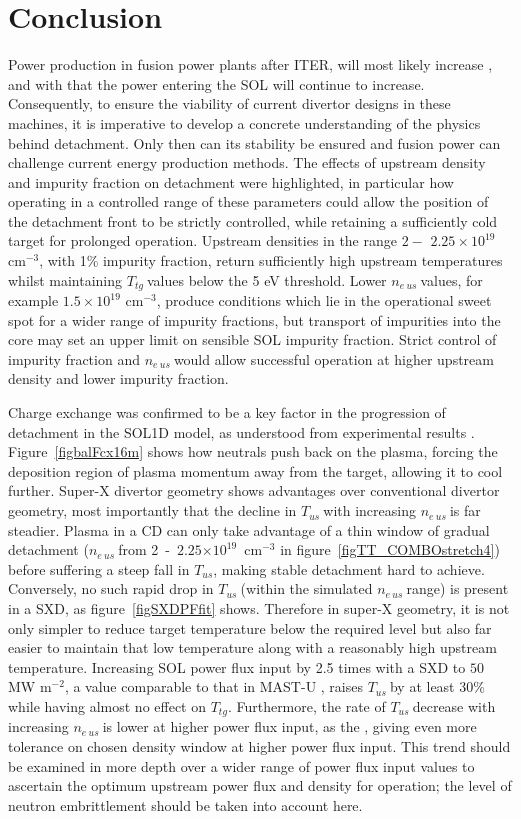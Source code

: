 \documentclass[12pt]{article}  %
\providecommand{\e}[1]{\ensuremath{\times 10^{#1}}} %
\providecommand{\noNe}[1]{{${#1}\times 10^{19}$ cm$^{-3}$}} %
\providecommand{\pow}[1]{{$^{#1}$}} %
\providecommand{\neus}{$n_{e~us}~$} %
\providecommand{\Tus}{$T_{us}~$} %
\providecommand{\Ttg}{$T_{tg}~$} %
\begin{document}
\section{Conclusion}\label{secConclusion}
Power production in fusion power plants after ITER, will most likely increase \cite{Federici2014}, and with that the power entering the SOL will continue to increase. Consequently, to ensure the viability of current divertor designs in these machines, it is imperative to develop a concrete understanding of the physics behind detachment. Only then can its stability be ensured and fusion power can challenge current energy production methods. The effects of upstream density and impurity fraction on detachment were highlighted, in particular how operating in a controlled range of these parameters could allow the position of the detachment front to be strictly controlled, while retaining a sufficiently cold target for prolonged operation. Upstream densities in the range $2 -$ \noNe{2.25}, with 1\% impurity fraction, return sufficiently high upstream temperatures whilst maintaining \Ttg values below the 5 eV threshold. Lower \neus values, for example \noNe{1.5}, produce conditions which lie in the operational sweet spot for a wider range of impurity fractions, but transport of impurities into the core may set an upper limit on sensible SOL impurity fraction. Strict control of impurity fraction and \neus would allow successful operation at higher upstream density and lower impurity fraction. 

Charge exchange was confirmed to be a key factor in the progression of detachment in the SOL1D model, as understood from experimental results \cite{Loarte1998, Wischmeier2009}. Figure~\ref{figbalFcx16m} shows how neutrals push back on the plasma, forcing the deposition region of plasma momentum away from the target, allowing it to cool further. Super-X divertor geometry shows advantages over conventional divertor geometry, most importantly that the decline in \Tus with increasing \neus is far steadier. Plasma in a CD can only take advantage of a thin window of gradual detachment (\neus from 2~-~$2.25\e{19}$~cm\pow{-3} in figure~\ref{figTT_COMBOstretch4}) before suffering a steep fall in $T_{us}$, making stable detachment hard to achieve. Conversely, no such rapid drop in \Tus (within the simulated \neus range) is present in a SXD, as figure~\ref{figSXDPFfit} shows. Therefore in super-X geometry, it is not only simpler to reduce target temperature below the required level but also far easier to maintain that low temperature along with a reasonably high upstream temperature. Increasing SOL power flux input by 2.5 times with a SXD to $50$ MW m\pow{-2}, a value comparable to that in MAST-U \cite{Havlickova2014}, raises \Tus by at least 30\% while having almost no effect on $T_{tg}$. Furthermore, the rate of \Tus decrease with increasing \neus is lower at higher power flux input, as the , giving even more tolerance on chosen density window at higher power flux input. This trend should be examined in more depth over a wider range of power flux input values to ascertain the optimum upstream power flux and density for operation; the level of neutron embrittlement should be taken into account here.
\end{document}
